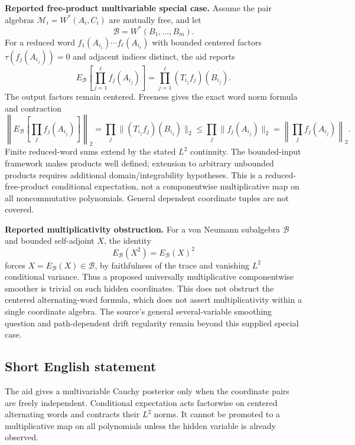 \documentclass[11pt]{article}
\begin{document}
\textbf{Reported free-product multivariable special case.} Assume the pair algebras \(\mathcal M_i=W^*(A_i,C_i)\) are mutually free, and let
\[
 \mathcal B=W^*(B_1,\ldots,B_m).
\]
For a reduced word \(f_1(A_{i_1})\cdots f_\ell(A_{i_\ell})\) with bounded centered factors \(\tau(f_j(A_{i_j}))=0\) and adjacent indices distinct, the aid reports
\[
 E_{\mathcal B}\left[\prod_{j=1}^\ell f_j(A_{i_j})\right]
 =\prod_{j=1}^\ell(T_{i_j}f_j)(B_{i_j}).
\]
The output factors remain centered. Freeness gives the exact word norm formula and contraction
\[
 \left\|E_{\mathcal B}\left[\prod_j f_j(A_{i_j})\right]\right\|_2
 =\prod_j\|(T_{i_j}f_j)(B_{i_j})\|_2
 \leq\prod_j\|f_j(A_{i_j})\|_2
 =\left\|\prod_jf_j(A_{i_j})\right\|_2.
\]
Finite reduced-word sums extend by the stated \(L^2\) continuity. The bounded-input framework makes products well defined; extension to arbitrary unbounded products requires additional domain/integrability hypotheses. This is a reduced-free-product conditional expectation, not a componentwise multiplicative map on all noncommutative polynomials. General dependent coordinate tuples are not covered.

\textbf{Reported multiplicativity obstruction.} For a von Neumann subalgebra \(\mathcal B\) and bounded self-adjoint \(X\), the identity
\[
 E_{\mathcal B}(X^2)=E_{\mathcal B}(X)^2
\]
forces \(X=E_{\mathcal B}(X)\in\mathcal B\), by faithfulness of the trace and vanishing \(L^2\) conditional variance. Thus a proposed universally multiplicative componentwise smoother is trivial on such hidden coordinates. This does not obstruct the centered alternating-word formula, which does not assert multiplicativity within a single coordinate algebra. The source's general several-variable smoothing question and path-dependent drift regularity remain beyond this supplied special case.
\subsection{Short English statement}
The aid gives a multivariable Cauchy posterior only when the coordinate pairs are freely independent. Conditional expectation acts factorwise on centered alternating words and contracts their \(L^2\) norms. It cannot be promoted to a multiplicative map on all polynomials unless the hidden variable is already observed.
\end{document}
